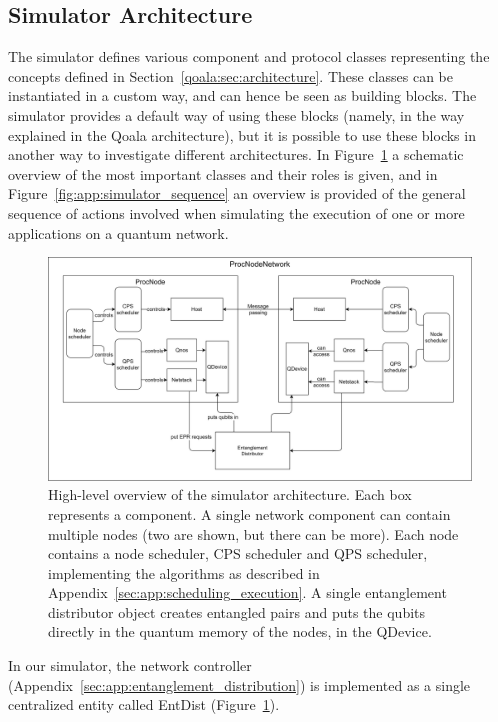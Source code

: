\subsection{Simulator Architecture}
The simulator defines various component and protocol classes representing the concepts defined in Section~\ref{qoala:sec:architecture}. These classes can be instantiated in a custom way, and can hence be seen as building blocks. The simulator provides a default way of using these blocks (namely, in the way explained in the Qoala architecture), but it is possible to use these blocks in another way to investigate different architectures.
In Figure~\ref{fig:app:simulator} a schematic overview of the most important classes and their roles is given, and in Figure~\ref{fig:app:simulator_sequence} an overview is provided of the general sequence of actions involved when simulating the execution of one or more applications on a quantum network.


\begin{figure}[hp]
    \centering
    \includegraphics[width=\textwidth]{figures/qoala/simulator.png}
    \caption{High-level overview of the simulator architecture. Each box represents a component.
    A single network component can contain multiple nodes (two are shown, but there can be more).
    Each node contains a node scheduler, CPS scheduler and QPS scheduler, implementing the algorithms as described in Appendix~\ref{sec:app:scheduling_execution}.
    A single entanglement distributor object creates entangled pairs and puts the qubits directly in the quantum memory of the nodes, in the QDevice.
    }
    \label{fig:app:simulator}
\end{figure}

In our simulator, the network controller (Appendix~\ref{sec:app:entanglement_distribution})
is implemented as a single centralized entity called EntDist (Figure~\ref{fig:app:simulator}).

